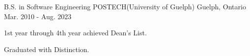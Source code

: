 


\begin{cventries}


\cventry
{B.S. in Software Engineering} %
{POSTECH(University of Guelph)} %
{Guelph, Ontario} %
{Mar. 2010 - Aug. 2023} %
{ %
\begin{cvitems}
\item {1st year through 4th year achieved Dean's List.}
\item {Graduated with Distinction.}
\end{cvitems}
}


\end{cventries}
